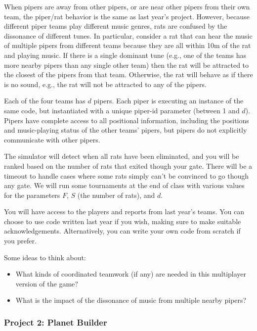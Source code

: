 When pipers are away from other pipers, or are near other pipers from
their own team, the piper/rat behavior is the same as last year's
project.  However, because different piper teams play different music
genres, rats are confused by the dissonance of different tunes.  In
particular, consider a rat that can hear the music of multiple pipers
from different teams because they are all within 10m of the rat and
playing music.  If there is a single dominant tune (e.g., one of the
teams has more nearby pipers than any single other team) then the rat
will be attracted to the closest of the pipers from that team.
Otherwise, the rat will behave as if there is no sound, e.g., the rat
will not be attracted to any of the pipers.

Each of the four teams has $d$ pipers.  Each piper is executing an
instance of the same code, but instantiated with a unique piper-id
parameter (between 1 and $d$).  Pipers have complete access to all
positional information, including the positions and music-playing status of
the other teams' pipers, but pipers do not explicitly communicate with other
pipers.

The simulator will detect when all rats have been eliminated, and you will be ranked based
on the number of rats that exited though your gate.  There will be a timeout to
handle cases where some rats simply can't be convinced
to go though any gate.  We will run some tournaments at the end of class
with various values for the parameters $F$, $S$ (the number of rats), and $d$.

You will have access to the players and reports from last year's
teams.  You can choose to use code written last year if you wish,
making sure to make suitable acknowledgements.  Alternatively, you can
write your own code from scratch if you prefer.

Some ideas to think about:
\begin{itemize}
\item What kinds of coordinated teamwork (if any) are needed in this multiplayer version of the game?
\item What is the impact of the dissonance of music from multiple nearby pipers?
\end{itemize}

\subsubsection{Project 2: Planet Builder}

